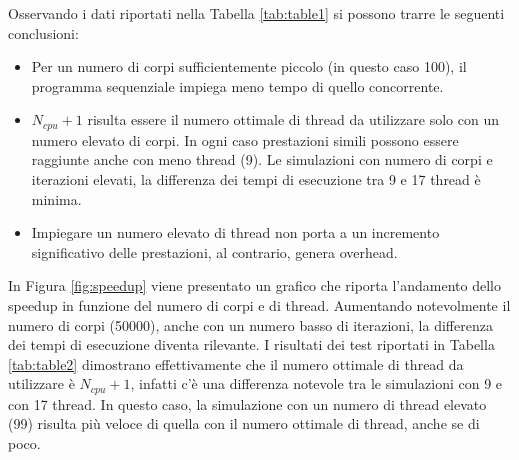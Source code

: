 \documentclass[12pt,a4paper,openright,twoside]{book}
\begin{document}
Osservando i dati riportati nella Tabella \ref{tab:table1}
si possono trarre le seguenti conclusioni:
\begin{itemize}
	\item Per un numero di corpi sufficientemente piccolo (in questo caso 100),
	il programma sequenziale impiega meno tempo di quello concorrente.
	\item $N_{cpu}+1$ risulta essere il numero ottimale di thread da utilizzare
	solo con un numero elevato di corpi. In ogni caso prestazioni simili possono essere raggiunte anche con meno thread (9).
	Le simulazioni con numero di corpi e iterazioni elevati, la differenza dei tempi di esecuzione tra 9 e 17 thread è minima.
	\item Impiegare un numero elevato di thread non porta a un incremento significativo delle prestazioni, al contrario, genera overhead.
\end{itemize}

In Figura \ref{fig:speedup} viene presentato un grafico che riporta l'andamento dello speedup in funzione del numero di corpi e di thread.
Aumentando notevolmente il numero di corpi (50000), anche con un numero basso di iterazioni,
la differenza dei tempi di esecuzione diventa rilevante.
I risultati dei test riportati in Tabella \ref{tab:table2} dimostrano effettivamente che
il numero ottimale di thread da utilizzare è $N_{cpu} + 1$, infatti c'è una differenza notevole tra le simulazioni con 9 e con 17 thread. 
In questo caso, la simulazione con un numero di thread elevato (99) risulta più veloce di quella con il numero ottimale di thread, anche se di poco.
\end{document}
